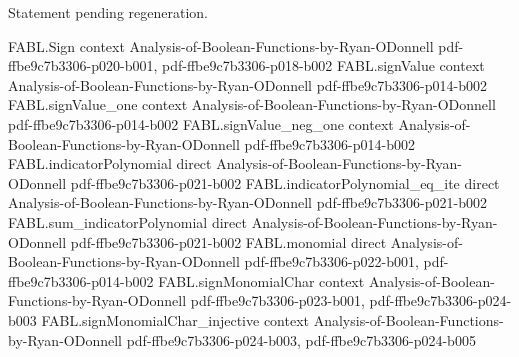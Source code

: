 \begin{theorem}
\label{FABL.coordinateLaplacian_eq_fourier_sum}
\leanok
{}
Statement pending regeneration.
\end{theorem}

\begin{theorem}
\label{FABL.fourierCoeff_coordinateLaplacian}
\leanok
{}
\proofstep
  {FABL.Sign}
  {context}
  {Analysis-of-Boolean-Functions-by-Ryan-ODonnell}
  {pdf-ffbe9c7b3306-p020-b001,
    pdf-ffbe9c7b3306-p018-b002}
\proofstep
  {FABL.signValue}
  {context}
  {Analysis-of-Boolean-Functions-by-Ryan-ODonnell}
  {pdf-ffbe9c7b3306-p014-b002}
\proofstep
  {FABL.signValue_one}
  {context}
  {Analysis-of-Boolean-Functions-by-Ryan-ODonnell}
  {pdf-ffbe9c7b3306-p014-b002}
\proofstep
  {FABL.signValue_neg_one}
  {context}
  {Analysis-of-Boolean-Functions-by-Ryan-ODonnell}
  {pdf-ffbe9c7b3306-p014-b002}
\proofstep
  {FABL.indicatorPolynomial}
  {direct}
  {Analysis-of-Boolean-Functions-by-Ryan-ODonnell}
  {pdf-ffbe9c7b3306-p021-b002}
\proofstep
  {FABL.indicatorPolynomial_eq_ite}
  {direct}
  {Analysis-of-Boolean-Functions-by-Ryan-ODonnell}
  {pdf-ffbe9c7b3306-p021-b002}
\proofstep
  {FABL.sum_indicatorPolynomial}
  {direct}
  {Analysis-of-Boolean-Functions-by-Ryan-ODonnell}
  {pdf-ffbe9c7b3306-p021-b002}
\proofstep
  {FABL.monomial}
  {direct}
  {Analysis-of-Boolean-Functions-by-Ryan-ODonnell}
  {pdf-ffbe9c7b3306-p022-b001,
    pdf-ffbe9c7b3306-p014-b002}
\proofstep
  {FABL.signMonomialChar}
  {context}
  {Analysis-of-Boolean-Functions-by-Ryan-ODonnell}
  {pdf-ffbe9c7b3306-p023-b001,
    pdf-ffbe9c7b3306-p024-b003}
\proofstep
  {FABL.signMonomialChar_injective}
  {context}
  {Analysis-of-Boolean-Functions-by-Ryan-ODonnell}
  {pdf-ffbe9c7b3306-p024-b003,
    pdf-ffbe9c7b3306-p024-b005}

\end{theorem}

